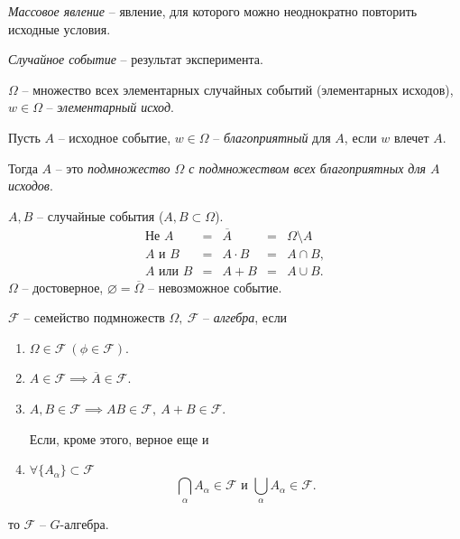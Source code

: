 

\begin{note}
  \emph{Массовое явление} -- явление, для которого можно неоднократно повторить исходные условия.

  \emph{Случайное событие} -- результат эксперимента.
  \begin{figure}[ht]
    \centering
    \label{fig:fig-1}
  \end{figure}

    $\Omega$ -- множество всех элементарных случайных событий (элементарных исходов), $w \in \Omega$ -- \emph{элементарный исход}.
\end{note}

\begin{definition}
  Пусть $A$ -- исходное событие, $w \in \Omega$ -- \emph{благоприятный} для $A$, если $w$ влечет $A$.

  Тогда $A$ -- это \emph{подмножество $\Omega$ с подмножеством всех благоприятных для $A$ исходов}.
\end{definition}

\begin{note}
  $A,B$ -- случайные события ($A,B \subset \Omega$).
  \[
    \begin{array}{ccccc}
        \text{Не } A & = & \overline{A} & = & \Omega \setminus A \\
        A \text{ и } B & = & A \cdot B & = & A \cap B, \\
        A \text{ или } B & = & A + B & = & A \cup B.
    \end{array} 
  \]
    $\Omega$ -- достоверное, $\varnothing = \overline{\Omega}$ -- невозможное событие.
\end{note}

\begin{definition}[Алгебра]
  $\mathcal{F}$ -- семейство подмножеств $\Omega, \ \mathcal{F}$ -- \emph{алгебра}, если 
    \begin{enumerate}
        \item $\Omega \in \mathcal{F} \ (\phi \in \mathcal{F})$.
        \item $A \in \mathcal{F}\implies \overline{A} \in \mathcal{F}$.
        \item $A,B \in \mathcal{F}\implies AB \in \mathcal{F}, \ A+B\in \mathcal{F}$.

        Если, кроме этого, верное еще и
    \item $\forall \{A_{\alpha}\}\subset \mathcal{F}$
    \[
        \bigcap_{\alpha}A_{\alpha}\in \mathcal{F} \text{ и } \bigcup_{\alpha}A_{\alpha}\in \mathcal{F}.
    \]
    \end{enumerate}
    то $\mathcal{F}$ -- $G$-алгебра.
\end{definition}


